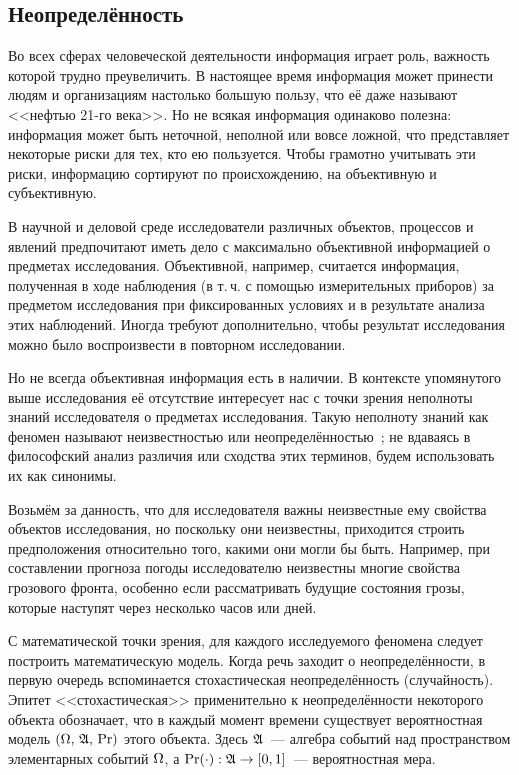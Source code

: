 
\subsection{Неопределённость}
\label{sec:intro_uncertainty}

Во всех сферах человеческой деятельности информация играет роль, важность которой трудно преувеличить. В настоящее время информация  может принести людям и организациям настолько большую пользу, что её даже называют <<нефтью 21-го века>>. Но не всякая информация одинаково полезна: информация может быть неточной, неполной или вовсе ложной, что представляет некоторые риски для тех, кто ею пользуется. Чтобы грамотно учитывать эти риски, информацию сортируют по происхождению, на объективную и субъективную.

В научной и деловой среде исследователи различных объектов, процессов и явлений предпочитают иметь дело с максимально объективной информацией о предметах исследования. Объективной, например, считается информация, полученная в ходе наблюдения (в т.\,ч. с помощью измерительных приборов) за предметом исследования при фиксированных условиях и в результате анализа этих наблюдений. Иногда требуют дополнительно, чтобы результат исследования можно было воспроизвести в повторном исследовании. 
  
Но не всегда объективная информация есть в наличии. В контексте упомянутого выше исследования её отсутствие интересует нас с точки зрения неполноты знаний исследователя о предметах исследования. Такую неполноту знаний как феномен называют неизвестностью или неопределённостью~\cite{falomkina}; не вдаваясь в философский анализ различия или сходства этих терминов, будем использовать их как синонимы.  

Возьмём за данность, что для исследователя важны неизвестные ему свойства объектов исследования, но поскольку они неизвестны, приходится строить предположения относительно того, какими они могли бы быть. Например, при составлении прогноза погоды исследователю неизвестны многие свойства грозового фронта, особенно если рассматривать будущие состояния грозы, которые наступят через несколько часов или дней.

С математической точки зрения, для каждого исследуемого феномена следует построить математическую модель.  Когда речь заходит о неопределённости, в первую очередь вспоминается стохастическая неопределённость (случайность). Эпитет <<стохастическая>> применительно к неопределённости некоторого объекта обозначает, что в каждый момент времени существует вероятностная модель ${(\Omega,\,{\mathfrak{A}},\,{\mathrm{Pr}})}$ этого объекта. Здесь ${\mathfrak{A}}$~--- алгебра событий над пространством элементарных событий $\Omega$, а ${\mathrm{Pr}}(\cdot): {\mathfrak{A}} \to [0,1]$~--- вероятностная мера. 

